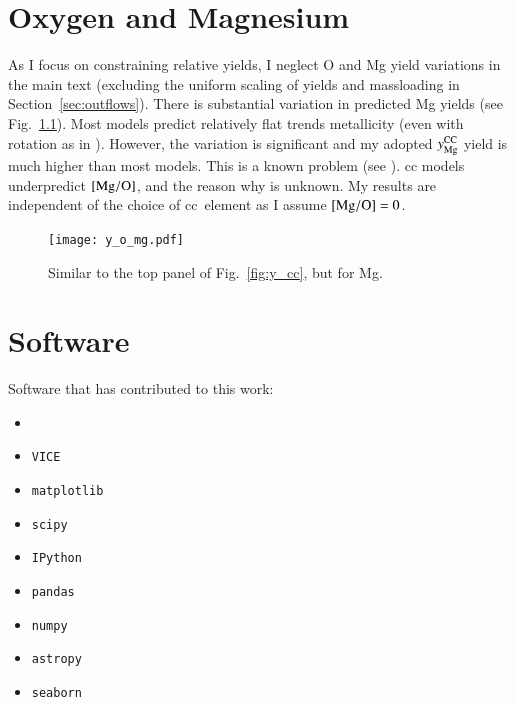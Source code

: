 \documentclass[12pt,oneside,letterpaper]{report}
\newcommand{\cc}{\gls{cc}}
\newcommand{\VICE}{\texttt{VICE}}
\newcommand{\Yoc}{\ensuremath{y_{\rm Mg}^{\rm CC}}}
\begin{document}
\newpage
\chapter{Oxygen and Magnesium}\label{sec:alt_agb}

As I focus on constraining relative yields, I neglect O and Mg yield variations in the main text (excluding the uniform scaling of yields and \gls{massloading} in Section~\ref{sec:outflows}). There is substantial variation in predicted Mg yields (see Fig.~\ref{fig:y_mg}). Most models predict relatively flat trends metallicity (even with rotation as in \citealt{LC18}). However, the variation is significant and my adopted $\Yoc$ yield is much higher than most models. This is a known problem (see \citealt{emily+21}). \Gls{cc} models underpredict $[{\rm Mg}/{\rm O}]$, and the reason why is unknown. My results are independent of the choice of \cc\ element as I assume $[{\rm Mg}/{\rm O}]=0$.



\begin{figure}[htp]
    \centering
    \texttt{[image: y\_o\_mg.pdf]}
    \caption[O/Mg Yields]{Similar to the top panel of Fig.~\ref{fig:y_cc}, but for Mg.
    }
    \label{fig:y_mg}
\end{figure}



\chapter{Software}
Software that has contributed to this work:

\begin{itemize}
    \item \citet{OhioSupercomputerCenter1987}
    \item \VICE~\citep{JW20, james+21}
    \item \texttt{matplotlib} \citep{matplotlib}
    \item \texttt{scipy} \citep{scipy}
    \item \texttt{IPython} \citep{ipy}
    \item \texttt{pandas} \citep{pandas}
    \item \texttt{numpy} \citep{numpy}
    \item \texttt{astropy} \citep{astropy:2013, astropy:2018, astropy:2022}
    \item \texttt{seaborn} \citep{seaborn}
\end{itemize}
\end{document}
